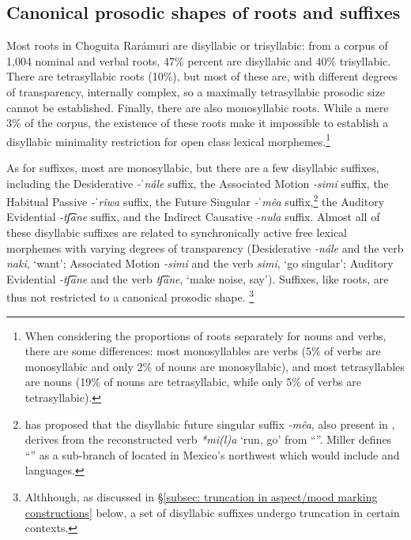 \subsection{Canonical prosodic shapes of roots and suffixes}
\label{subsec: canonical prosodic shapes of roots and suffixes}

Most roots in Choguita Rarámuri are disyllabic or trisyllabic: from a corpus of 1,004 nominal and verbal roots, 47\% percent are disyllabic and 40\% trisyllabic. There are tetrasyllabic roots (10\%), but most of these are, with different degrees of transparency, internally complex, so a maximally tetrasyllabic prosodic size cannot be established. Finally, there are also monosyllabic roots. While a mere 3\% of the corpus, the existence of these roots make it impossible to establish a disyllabic minimality restriction for open class lexical morphemes.\footnote{When considering the proportions of roots separately for nouns and verbs, there are some differences: most monosyllables are verbs (5\% of verbs are monosyllabic and only 2\% of nouns are monosyllabic), and most tetrasyllables are nouns (19\% of nouns are tetrasyllabic, while only 5\% of verbs are tetrasyllabic).}

As for suffixes, most are monosyllabic, but there are a few disyllabic suffixes, including the Desiderative \textit{-ˈnále} suffix, the Associated Motion \textit{-simi} suffix, the Habitual Passive \textit{-ˈrîwa} suffix, the Future Singular \textit{-ˈmêa} suffix,\footnote{\citet{miller1996guarijio} has proposed that the disyllabic future singular suffix \textit{-mêa}, also present in , derives from the reconstructed verb \textit{*mi(l)a} ‘run, go’ \citep[133]{miller1996guarijio} from “”. Miller defines “” as a sub-branch of  located in Mexico’s northwest which would include  and  languages.} the Auditory Evidential \textit{-tʃ͡ane} suffix, and the Indirect Causative \textit{-nula} suffix. Almost all of these disyllabic suffixes are related to synchronically active free lexical morphemes with varying degrees of transparency (Desiderative \textit{-nále} and the verb \textit{naki}, ‘want’; Associated Motion \textit{-simi} and the verb \textit{simi}, ‘go singular’; Auditory Evidential \textit{-tʃ͡ane} and the verb \textit{tʃ͡ane}, ‘make noise, say’). Suffixes, like roots, are thus not restricted to a canonical prosodic shape. \footnote{Althhough, as discussed in §\ref{subsec: truncation in aspect/mood marking constructions} below, a set of disyllabic suffixes undergo truncation in certain contexts.}


